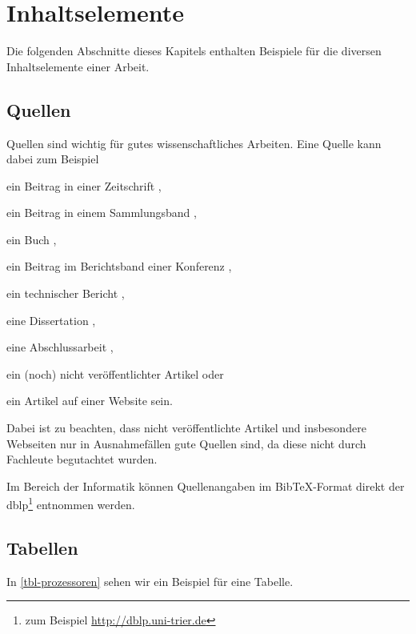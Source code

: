 
\chapter{Inhaltselemente}

Die folgenden Abschnitte dieses Kapitels enthalten Beispiele für die diversen Inhaltselemente einer Arbeit.

\section{Quellen}

Quellen sind wichtig für gutes wissenschaftliches Arbeiten. Eine Quelle kann dabei zum Beispiel
\begin{compactitem}
  \item ein Beitrag in einer Zeitschrift \cite{MopOverview},
  \item ein Beitrag in einem Sammlungsband \cite{moore},
  \item ein Buch \cite{scala},
  \item ein Beitrag im Berichtsband einer Konferenz \cite{rltl},
  \item ein technischer Bericht \cite{bitkom},
  \item eine Dissertation \cite{Leucker02},
  \item eine Abschlussarbeit \cite{RltlConv},
  \item ein (noch) nicht veröffentlichter Artikel \cite{ptLTL} oder
  \item ein Artikel auf einer Website \cite{codecommit} sein.
\end{compactitem}

Dabei ist zu beachten, dass nicht veröffentlichte Artikel und insbesondere Webseiten nur in Ausnahmefällen gute Quellen sind, da diese nicht durch Fachleute begutachtet wurden.

Im Bereich der Informatik können Quellenangaben im Bib\TeX-Format direkt der dblp\footnote{zum Beispiel \url{http://dblp.uni-trier.de}} entnommen werden.

\section{Tabellen}

In \vref{tbl-prozessoren} sehen wir ein Beispiel für eine Tabelle.

